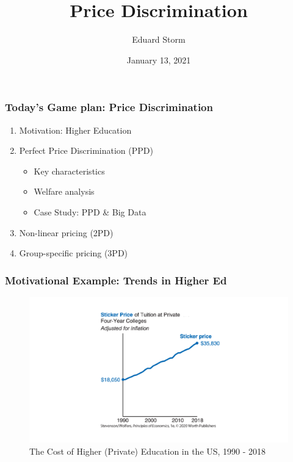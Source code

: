 \documentclass[10pt]{beamer}
\title[Price Discrimination]{Price Discrimination} %
\author{Eduard Storm} %
\institute[estorm@carleton.edu]
{
	
	
	\medskip 
	
	Winter Term 2021
	
	
	
}
\date{January 13, 2021} %
\begin{document}
\begin{frame}
\titlepage %
\end{frame}


\begin{frame} 
	\frametitle{Today's Game plan: Price Discrimination}
	
	
	\begin{enumerate}
		\item Motivation: Higher Education
		\item Perfect Price Discrimination (PPD)
			\begin{itemize}
				\item Key characteristics
				\item Welfare analysis
				\item Case Study: PPD \& Big Data
			\end{itemize}
		\item Non-linear pricing (2PD)
		\item Group-specific pricing (3PD)
	\end{enumerate}
	
	
\end{frame}
\begin{frame} 
	\frametitle{Motivational Example: Trends in Higher Ed}
	

 \begin{figure}[H]
		\centering
		\includegraphics[width=1.0\linewidth]{college_intro}
		\caption{The Cost of Higher (Private) Education in the US, 1990 - 2018 \\ 
			\label{fig:nopd}}
 \end{figure}

	
\end{frame}
\end{document}
